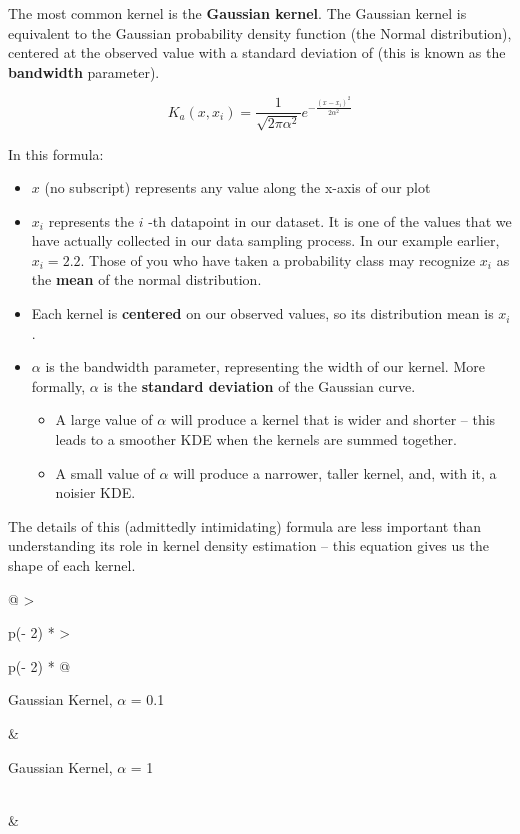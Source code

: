 \documentclass[
  letterpaper,
  DIV=11,
  numbers=noendperiod]{scrreprt}
\providecommand{\tightlist}{%
  \setlength{\itemsep}{0pt}\setlength{\parskip}{0pt}}\usepackage{longtable,booktabs,array}
\begin{document}
The most common kernel is the \textbf{Gaussian kernel}. The Gaussian
kernel is equivalent to the Gaussian probability density function (the
Normal distribution), centered at the observed value with a standard
deviation of (this is known as the \textbf{bandwidth} parameter).

\[K_a(x, x_i) = \frac{1}{\sqrt{2\pi\alpha^{2}}}e^{-\frac{(x-x_i)^{2}}{2\alpha^{2}}}\]

In this formula:

\begin{itemize}
\tightlist
\item
  \(x\) (no subscript) represents any value along the x-axis of our plot
\item
  \(x_i\) represents the \(i\) -th datapoint in our dataset. It is one
  of the values that we have actually collected in our data sampling
  process. In our example earlier, \(x_i=2.2\). Those of you who have
  taken a probability class may recognize \(x_i\) as the \textbf{mean}
  of the normal distribution.
\item
  Each kernel is \textbf{centered} on our observed values, so its
  distribution mean is \(x_i\).
\item
  \(\alpha\) is the bandwidth parameter, representing the width of our
  kernel. More formally, \(\alpha\) is the \textbf{standard deviation}
  of the Gaussian curve.

  \begin{itemize}
  \tightlist
  \item
    A large value of \(\alpha\) will produce a kernel that is wider and
    shorter -- this leads to a smoother KDE when the kernels are summed
    together.
  \item
    A small value of \(\alpha\) will produce a narrower, taller kernel,
    and, with it, a noisier KDE.
  \end{itemize}
\end{itemize}

The details of this (admittedly intimidating) formula are less important
than understanding its role in kernel density estimation -- this
equation gives us the shape of each kernel.

\begin{longtable}[]{@{}
  >{\raggedright\arraybackslash}p{(\columnwidth - 2\tabcolsep) * }
  >{\raggedright\arraybackslash}p{(\columnwidth - 2\tabcolsep) * }@{}}
\toprule\noalign{}
\begin{minipage}[b]{\linewidth}\raggedright
Gaussian Kernel, \(\alpha\) = 0.1
\end{minipage} & \begin{minipage}[b]{\linewidth}\raggedright
Gaussian Kernel, \(\alpha\) = 1
\end{minipage} \\
\midrule\noalign{}
\endhead
\bottomrule\noalign{}
\endlastfoot
& \\
\end{longtable}
\end{document}
